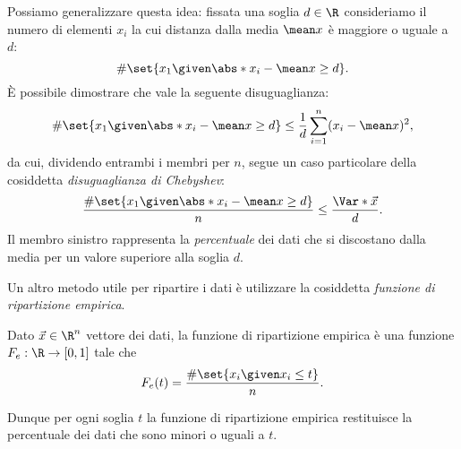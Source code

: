 Possiamo generalizzare questa idea: fissata una soglia $d \in \R$ consideriamo il numero di elementi $x_i$ la cui distanza dalla media $\mean x$ è maggiore o uguale a $d$: \[
    \#\set{x_1 \given \abs*{x_i - \mean x} \geq d}.
\] È possibile dimostrare che vale la seguente disuguaglianza: \[
    \#\set{x_1 \given \abs*{x_i - \mean x} \geq d} \leq \frac{1}{d}\sum_{i=1}^n (x_i - \mean x)^2,
\] da cui, dividendo entrambi i membri per $n$, segue un caso particolare della cosiddetta \emph{disuguaglianza di Chebyshev}: \begin{equation}
    \frac{\#\set{x_1 \given \abs*{x_i - \mean x} \geq d}}{n} \leq \frac{\Var*{\vec x}}{d}.
\end{equation} Il membro sinistro rappresenta la \emph{percentuale} dei dati che si discostano dalla media per un valore superiore alla soglia $d$.

Un altro metodo utile per ripartire i dati è utilizzare la cosiddetta \emph{funzione di ripartizione empirica}.
\begin{definition}
    Dato $\vec{x} \in \R^n$ vettore dei dati, la funzione di ripartizione empirica è una funzione $F_e : \R \to [0,1]$ tale che \begin{equation*}
        F_e(t) = \frac{\#\set{x_i \given x_i \leq t}}{n}.
    \end{equation*}
\end{definition}
Dunque per ogni soglia $t$ la funzione di ripartizione empirica restituisce la percentuale dei dati che sono minori o uguali a $t$.

